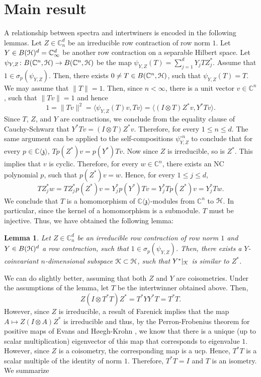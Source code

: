 \documentclass{article}
\newtheorem{lem}[thm]{Lemma}
\theoremstyle{definition}
\theoremstyle{remark}
\numberwithin{equation}{section}
\def\C{\mathbb{C}}
\def\fp{\mathbb{C} \langle \mathbb{\mathfrak{z}} \rangle }
\begin{document}
\section{Main result} \label{sec:main}


A relationship between spectra and intertwiners is encoded in the following lemmas. Let $Z \in \C^d_n$ be an irreducible row contraction of row norm $1$. Let $Y \in B (\cH)^d =\C ^d _\infty$ be another row contraction on a separable Hilbert space. Let $\psi_{Y,Z} \colon B(\C^n, \cH) \to B(\C^n, \cH)$ be the map $\psi_{Y,Z}(T) = \sum_{j=1}^d Y_j T Z_j^*$. Assume that $1 \in \sigma_p(\psi_{Y,Z})$. Then, there exists $0 \neq T \in B(\C^n, \cH)$, such that $\psi_{Y,Z}(T) = T$. We may assume that $\|T\| = 1$. Then, since $n < \infty$, there is a unit vector $v \in \C^n$, such that $\|T v\| = 1$ and hence
\[
1 = \|T v\|^2 = \langle \psi_{Y,Z}(T) v, T v \rangle = \langle (I \otimes T) Z^* v, Y^* T v \rangle.
\]
Since $T$, $Z$, and $Y$ are contractions, we conclude from the equality clause of Cauchy-Schwarz that $Y^* T v = (I \otimes T) Z^* v$. Therefore, for every $1 \leq n \leq d$. The same argument can be applied to the self-compositions $\psi_{Y,Z}^{\circ n}$ to conclude that for every $p \in \fp$, $T p(Z^*) v = p(Y^*) T v$. Now since $Z$ is irreducible, so is $Z^*$. This implies that $v$ is cyclic. Therefore, for every $w \in \C^n$, there exists an NC polynomial $p$, such that $p(Z^*) v = w$. Hence, for every $1 \leq j \leq d$,
\[
T Z_j^* w = T Z_j^* p(Z^*) v = Y_j^* p(Y^*) T v = Y_j^* T p(Z^*) v = Y_j^* T w.
\]
We conclude that $T$ is a homomorphism of $\fp$-modules from $\C^n$ to ${\mathcal H}$. In particular, since the kernel of a homomorphism is a submodule. $T$ must be injective. Thus, we have obtained the following lemma:

\begin{lem} \label{lem_spectrum_to_embedding}
Let $Z \in \C^d_n$ be an irreducible row contraction of row norm $1$ and $Y \in B({\mathcal H})^d$ a row contraction, such that $1 \in \sigma_p(\psi_{Y,Z})$. Then, there exists a $Y$-coinvariant $n$-dimensional subspace ${\mathcal K} \subset {\mathcal H}$, such that $Y^*|_{{\mathcal K}}$ is similar to $Z^*$.
\end{lem}

We can do slightly better, assuming that both $Z$ and $Y$ are coisometries. Under the assumptions of the lemma, let $T$ be the intertwinner obtained above. Then,
\[
Z (I \otimes T^* T) Z^* = T^* Y Y^* T = T^* T.
\]
However, since $Z$ is irreducible, a result of Farenick \cite[Theorem 2]{Farenick-irr_pos} implies that the map $A \mapsto Z(I \otimes A) Z^*$ is irreducible and thus, by the Perron-Frobenius theorem for positive maps of Evans and H\o{}egh-Krohn \cite[Theorem 2.3]{EHK-PerronFrobenius}, we know that there is a unique (up to scalar multiplication) eigenvector of this map that corresponds to eigenvalue $1$. However, since $Z$ is a coisometry, the corresponding map is a ucp. Hence, $T^* T$ is a scalar multiple of the identity of norm $1$. Therefore, $T^* T = I$ and $T$ is an isometry. We summarize
\end{document}
